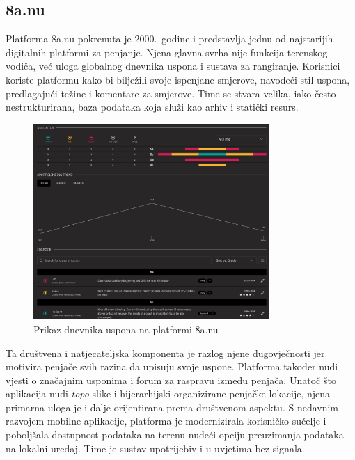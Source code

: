 \subsection{8a.nu}

Platforma 8a.nu pokrenuta je 2000.\ godine i predstavlja jednu od najstarijih digitalnih platformi za penjanje. Njena glavna svrha nije funkcija terenskog vodiča, već uloga globalnog dnevnika uspona i sustava za rangiranje. Korisnici koriste platformu kako bi bilježili svoje ispenjane smjerove, navodeći stil uspona, predlagajući težine i komentare za smjerove. Time se stvara velika, iako često nestrukturirana, baza podataka koja služi kao arhiv i statički resurs.

\begin{figure}[H]
    \centering
    \includegraphics[width=0.8\textwidth]{images/analiza/8anu_logbook.png}
    \caption{Prikaz dnevnika uspona na platformi 8a.nu}
\end{figure}

Ta društvena i natjecateljska komponenta je razlog njene dugovječnosti jer motivira penjače svih razina da upisuju svoje uspone. Platforma također nudi vjesti o značajnim usponima i forum za raspravu između penjača. Unatoč što aplikacija nudi \textit{topo} slike i hijerarhijski organizirane penjačke lokacije, njena primarna uloga je i dalje orijentirana prema društvenom aspektu. 
S nedavnim razvojem mobilne aplikacije, platforma je modernizirala korisničko sučelje i poboljšala dostupnost podataka na terenu nudeći opciju preuzimanja podataka na lokalni uređaj. Time je sustav upotrijebiv i u uvjetima bez signala.


